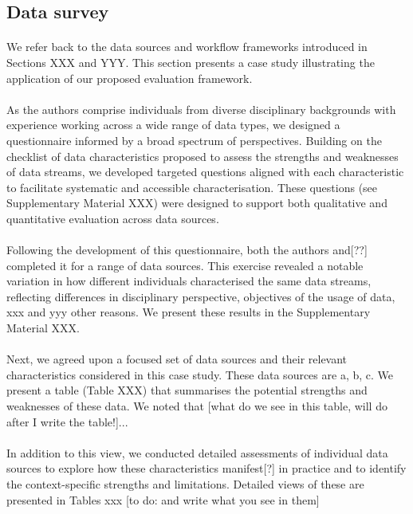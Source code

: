 \documentclass{article}
\begin{document}
\subsection{Data survey}

\paragraph{}We refer back to the data sources and workflow frameworks introduced in Sections XXX and YYY. This section presents a case study illustrating the application of our proposed evaluation framework. 

\paragraph{}As the authors comprise individuals from diverse disciplinary backgrounds with experience working across a wide range of data types, we designed a questionnaire informed by a broad spectrum of perspectives. Building on the checklist of data characteristics proposed to assess the strengths and weaknesses of data streams, we developed targeted questions aligned with each characteristic to facilitate systematic and accessible characterisation. These questions (see Supplementary Material XXX) were designed to support both qualitative and quantitative evaluation across data sources. 

\paragraph{}Following the development of this questionnaire, both the authors and[??] completed it for a range of data sources. This exercise revealed a notable variation in how different individuals characterised the same data streams, reflecting differences in disciplinary perspective, objectives of the usage of data, xxx and yyy other reasons. We present these results in the Supplementary Material XXX. 

\paragraph{}Next, we agreed upon a focused set of data sources and their relevant characteristics considered in this case study. These data sources are a, b, c. We present a table (Table XXX) that summarises the potential strengths and weaknesses of these data. We noted that [what do we see in this table, will do after I write the table!]... 

\paragraph{}In addition to this view, we conducted detailed assessments of individual data sources to explore how these characteristics manifest[?] in practice and to identify the context-specific strengths and limitations. Detailed views of these are presented in Tables xxx [to do: and write what you see in them]
\end{document}
